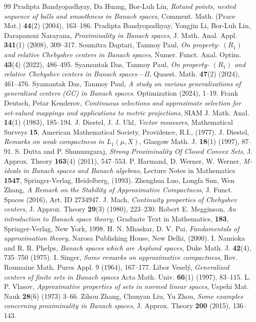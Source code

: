 \documentclass[11pt]{amsart}
\begin{document}
\begin{thebibliography}{99}
 Pradipta Bandyopadhyay, Da Huang, Bor-Luh Lin,
{\em Rotund points, nested sequence of balls and smoothness in Banach spaces}, Comment. Math. (Prace Mat.) {\bf 44}(2) (2004), 163--186.
Pradipta Bandyopadhyay,  Yongjin Li, Bor-Luh Lin, Darapaneni Narayana, {\em Proximinality in Banach spaces}, J. Math. Anal. Appl. {\bf 341}(1) (2008), 309--317.
 Soumitra Daptari, Tanmoy Paul, {\em On property- $(R_1)$  and relative Chebyshev centers in Banach spaces}, Numer. Funct. Anal. Optim. {\bf43}(4) (2022), 486--495.
 Syamantak Das, Tanmoy Paul, {\em On property- $(R_1)$  and relative Chebyshev centers in Banach spaces---{II}}, Quaest. Math. {\bf 47}(2) (2024), 461--476.
Syamantak Das, Tanmoy Paul, {\em A study on various generalizations of generalized centers (GC) in Banach spaces}. Optimization (2024), 1--19.
 Frank Deutsch, Petar Kenderov, {\em Continuous selections and approximate selection for set-valued mappings and applications to metric projections}, SIAM J. Math. Anal. {\bf 14}(1) (1983), 185--194.
J. Diestel, J. J. Uhl, {\em Vector measures}, Mathematical Surveys {\bf 15}, American Mathematical Society, Providence, R.I., (1977).
J. Diestel, {\em Remarks on weak compactness in $L_1(\mu,X)$}, Glasgow Math. J. {\bf 18}(1) (1997), 87--91.
 S. Dutta and P. Shunmugaraj, {\em Strong Proximinality Of Closed Convex Sets}, J. Approx. Theory {\bf 163}(4) (2011), 547--553. 
 P. Harmand, D. Werner, W. Werner, {\em M-ideals in Banach spaces and Banach algebras}, Lecture Notes in Mathematics {\bf 1547}, Springer-Verlag, Heidelberg, (1993).
 Zhenghua Luo, Longfa Sun, Wen Zhang, {\em A Remark on the Stability of Approximative Compactness}, J. Funct. Spaces (2016), Art. ID 2734947.
 J. Mach, {\em Continuity properties of Chebyshev centers}, J. Approx. Theory {\bf 29}(3) (1980), 223--230.
 Robert E. Megginson, {\em An introduction to Banach space theory}, Graduate Text in Mathematics, {\bf 183}, Springer-Verlag, New York, 1998.
 H. N. Mhaskar, D. V. Pai, {\em Fundamentals of approximation theory}, Narosa Publishing House, New Delhi, (2000).
 I. Namioka and R. R. Phelps, {\em Banach spaces which are Asplund spaces}, Duke Math. J. {\bf 42}(4), 735--750 (1975).
 I. Singer, {\em Some remarks on approximative compactness}, Rev. Roumaine Math. Pures Appl. 9 (1964), 167--177.
 Libor Vesel\'{y}, {\em Generalized centers of finite sets in Banach spaces} Acta Math. Univ.  {\bf66}(1) (1997), 83--115.
 L. P. Vlasov, {\em Approximative properties of sets in normed linear spaces}, Uspehi Mat. Nauk {\bf 28}(6) (1973) 3--66.
 Zihou Zhang, Chunyan Liu, Yu Zhou, {\em Some examples concerning proximinality in Banach spaces}, J. Approx. Theory {\bf 200} (2015), 136--143.
\end{thebibliography}
\end{document}
